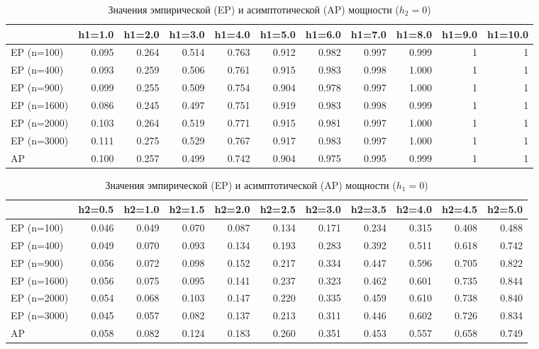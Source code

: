\documentclass[12pt]{article}
\theoremstyle{break}
\begin{document}
\begin{table}[!h]
	\centering
	\caption{Значения эмпирической (EP) и асимптотической (AP) мощности ($h_2=0$)}
	\hspace*{-1.0cm}\begin{tabular}
		{lrrrrrrrrrr}
		\toprule
		& h1=1.0 & h1=2.0 & h1=3.0 & h1=4.0 & h1=5.0 & h1=6.0 & h1=7.0 & h1=8.0 & h1=9.0 & h1=10.0\\
		\midrule
		EP (n=100) & 0.095 & 0.264 & 0.514 & 0.763 & 0.912 & 0.982 & 0.997 & 0.999 & 1 & 1\\
		EP (n=400) & 0.093 & 0.259 & 0.506 & 0.761 & 0.915 & 0.983 & 0.998 & 1.000 & 1 & 1\\
		EP (n=900) & 0.099 & 0.255 & 0.509 & 0.754 & 0.904 & 0.978 & 0.997 & 1.000 & 1 & 1\\
		EP (n=1600) & 0.086 & 0.245 & 0.497 & 0.751 & 0.919 & 0.983 & 0.998 & 0.999 & 1 & 1\\
		EP (n=2000) & 0.103 & 0.264 & 0.519 & 0.771 & 0.915 & 0.981 & 0.997 & 1.000 & 1 & 1\\
		EP (n=3000) & 0.111 & 0.275 & 0.529 & 0.767 & 0.917 & 0.983 & 0.997 & 1.000 & 1 & 1\\
		\addlinespace
		AP & 0.100 & 0.257 & 0.499 & 0.742 & 0.904 & 0.975 & 0.995 & 0.999 & 1 & 1\\
		\bottomrule
	\end{tabular}
	\label{tbl:ap_normal_h1_diff}
\end{table}

\begin{table}[!h]
	\caption{Значения эмпирической (EP) и асимптотической (AP) мощности ($h_1=0$)}
	\centering
	\hspace*{-1.0cm}\begin{tabular}
		{lrrrrrrrrrr}
		\toprule
		& h2=0.5 & h2=1.0 & h2=1.5 & h2=2.0 & h2=2.5 & h2=3.0 & h2=3.5 & h2=4.0 & h2=4.5 & h2=5.0\\
		\midrule
		EP (n=100) & 0.046 & 0.049 & 0.070 & 0.087 & 0.134 & 0.171 & 0.234 & 0.315 & 0.408 & 0.488\\
		EP (n=400) & 0.049 & 0.070 & 0.093 & 0.134 & 0.193 & 0.283 & 0.392 & 0.511 & 0.618 & 0.742\\
		EP (n=900) & 0.056 & 0.072 & 0.098 & 0.152 & 0.217 & 0.334 & 0.447 & 0.596 & 0.705 & 0.822\\
		EP (n=1600) & 0.056 & 0.075 & 0.095 & 0.141 & 0.237 & 0.323 & 0.462 & 0.601 & 0.735 & 0.844\\
		EP (n=2000) & 0.054 & 0.068 & 0.103 & 0.147 & 0.220 & 0.335 & 0.459 & 0.610 & 0.738 & 0.840\\
		EP (n=3000) & 0.045 & 0.057 & 0.082 & 0.137 & 0.213 & 0.311 & 0.446 & 0.602 & 0.726 & 0.834\\
		\addlinespace
		AP & 0.058 & 0.082 & 0.124 & 0.183 & 0.260 & 0.351 & 0.453 & 0.557 & 0.658 & 0.749\\
		\bottomrule
	\end{tabular}
	\label{tbl:ap_normal_h2_diff}
\end{table}
\end{document}
